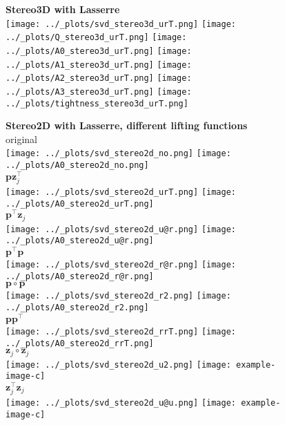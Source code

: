 \documentclass[11pt]{article}
\newcommand{\vc}[1]{\ensuremath{\bm{#1}}}
\begin{document}
\begin{figure}[h]
  \centering
  \textbf{\large{Stereo3D with Lasserre}} \\
  \vspace{2em}
  \texttt{[image: ../\_plots/svd\_stereo3d\_urT.png]}
  \texttt{[image: ../\_plots/Q\_stereo3d\_urT.png]}
  \texttt{[image: ../\_plots/A0\_stereo3d\_urT.png]}
  \texttt{[image: ../\_plots/A1\_stereo3d\_urT.png]}
  \texttt{[image: ../\_plots/A2\_stereo3d\_urT.png]}
  \texttt{[image: ../\_plots/A3\_stereo3d\_urT.png]}
  \texttt{[image: ../\_plots/tightness\_stereo3d\_urT.png]}
  \label{fig:noise}
\end{figure}



\begin{figure}[h]
  \centering
  \textbf{\large{Stereo2D with Lasserre, different lifting functions}}\\
  original \\
  \texttt{[image: ../\_plots/svd\_stereo2d\_no.png]}
  \texttt{[image: ../\_plots/A0\_stereo2d\_no.png]} \\
  $\vc{p}\vc{z}_j^\top$ \\
  \texttt{[image: ../\_plots/svd\_stereo2d\_urT.png]}
  \texttt{[image: ../\_plots/A0\_stereo2d\_urT.png]} \\
  $\vc{p}^\top\vc{z}_j$ \\
  \texttt{[image: ../\_plots/svd\_stereo2d\_u@r.png]}
  \texttt{[image: ../\_plots/A0\_stereo2d\_u@r.png]} \\
  $\vc{p}^\top\vc{p}$ \\
  \texttt{[image: ../\_plots/svd\_stereo2d\_r@r.png]}
  \texttt{[image: ../\_plots/A0\_stereo2d\_r@r.png]} \\
  $\vc{p}\circ\vc{p}$ \\
  \texttt{[image: ../\_plots/svd\_stereo2d\_r2.png]}
  \texttt{[image: ../\_plots/A0\_stereo2d\_r2.png]}  \\
  $\vc{p}\vc{p}^\top$ \\
  \texttt{[image: ../\_plots/svd\_stereo2d\_rrT.png]}
  \texttt{[image: ../\_plots/A0\_stereo2d\_rrT.png]}  \\
  $\vc{z}_j\circ\vc{z}_j$ \\
  \texttt{[image: ../\_plots/svd\_stereo2d\_u2.png]} 
  \texttt{[image: example-image-c]}  \\
  $\vc{z}_j^\top\vc{z}_j$ \\
  \texttt{[image: ../\_plots/svd\_stereo2d\_u@u.png]}
  \texttt{[image: example-image-c]}  \\
\end{figure}
\end{document}
